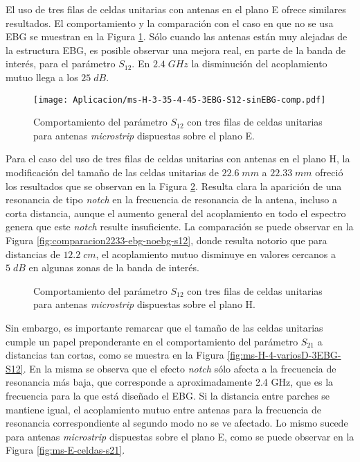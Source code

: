 El uso de tres filas de celdas unitarias con antenas en el plano E ofrece similares resultados. El comportamiento y la comparación con el caso en que no se usa EBG se muestran en la Figura \ref{fig:planoe-3ebg-comparacion}. Sólo cuando las antenas están muy alejadas de la estructura EBG, es posible observar una mejora real, en parte de la banda de interés, para el parámetro $S_{12}$. En $2.4\; GHz$ la disminución del acoplamiento mutuo llega a los $25\; dB$.

\begin{figure}[h]
	\centering
	\texttt{[image: Aplicacion/ms-H-3-35-4-45-3EBG-S12-sinEBG-comp.pdf]}
	\caption{Comportamiento del parámetro $S_{12}$ con tres filas de celdas unitarias para antenas \textit{microstrip} dispuestas sobre el plano E.}
	\label{fig:planoe-3ebg-comparacion}
\end{figure}


Para el caso del uso de tres filas de celdas unitarias con antenas en el plano H, la modificación del tamaño de las celdas unitarias de $22.6\;mm$ a $22.33 \;mm$ ofreció los resultados que se observan en la Figura \ref{fig:2233-2ebg-h}. Resulta clara la aparición de una resonancia de tipo \textit{notch} en la frecuencia de resonancia de la antena, incluso a corta distancia, aunque el aumento general del acoplamiento en todo el espectro genera que este \textit{notch} resulte insuficiente. La comparación se puede observar en la Figura \ref{fig:comparacion2233-ebg-noebg-s12}, donde resulta notorio que para distancias de $12.2 \;cm$, el acoplamiento mutuo disminuye en valores cercanos a $5\; dB$ en algunas zonas de la banda de interés.


\begin{figure}[H]
	\centering 
	\caption{Comportamiento del parámetro $S_{12}$ con tres filas de celdas unitarias para antenas \textit{microstrip} dispuestas sobre el plano H.}
	\label{fig:2233-2ebg-h}
\end{figure}

Sin embargo, es importante remarcar que el tamaño de las celdas unitarias cumple un papel preponderante en el comportamiento del parámetro $S_{21}$ a distancias tan cortas, como se muestra en la Figura \ref{fig:ms-H-4-variosD-3EBG-S12}. En la misma se observa que el efecto \textit{notch} sólo afecta a la frecuencia de resonancia más baja, que corresponde a aproximadamente 2.4 GHz, que es la frecuencia para la que está diseñado el EBG. Si la distancia entre parches se mantiene igual, el acoplamiento mutuo entre antenas para la frecuencia de resonancia correspondiente al segundo modo no se ve afectado. Lo mismo sucede para antenas \textit{microstrip} dispuestas sobre el plano E, como se puede observar en la Figura \ref{fig:ms-E-celdas-s21}.

